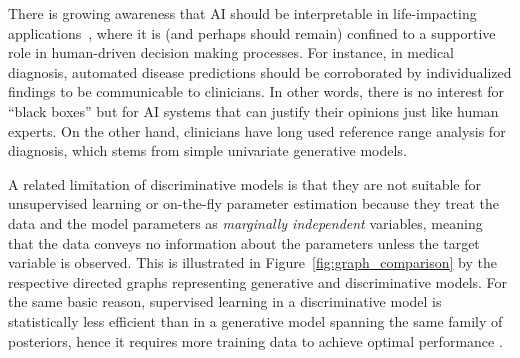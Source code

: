 \documentclass[english]{scrartcl}
\begin{document}
There is growing awareness that AI should be interpretable in life-impacting applications~\cite{Molnar-18}, where it is (and perhaps should remain) confined to a supportive role in human-driven decision making processes. For instance, in medical diagnosis, automated disease predictions should be corroborated by individualized findings to be communicable to clinicians. In other words, there is no interest for ``black boxes'' but for AI systems that can justify their opinions just like human experts. On the other hand, clinicians have long used reference range analysis for diagnosis, which stems from simple univariate generative models.





A related limitation of discriminative models is that they are not suitable for unsupervised learning or on-the-fly parameter estimation because they treat the data and the model parameters as {\em marginally independent} variables, meaning that the data conveys no information about the parameters unless the target variable is observed. This is illustrated in Figure~\ref{fig:graph_comparison} by the respective directed graphs representing generative and discriminative models. For the same basic reason, supervised learning in a discriminative model is statistically less efficient than in a generative model spanning the same family of posteriors, hence it requires more training data to achieve optimal performance \cite{Ng-01}. 
\end{document}
